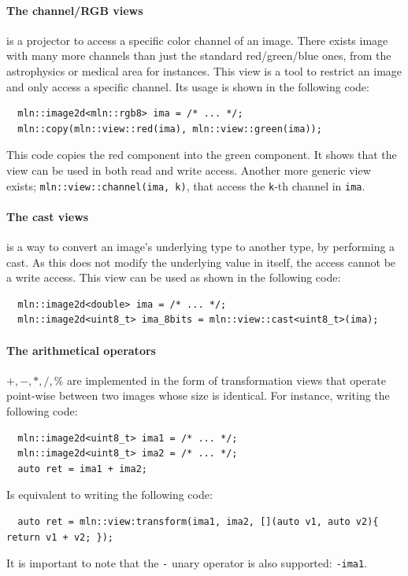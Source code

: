 \paragraph{The channel/RGB views} is a projector to access a specific color channel of an image. There exists image with
many more channels than just the standard red/green/blue ones, from the astrophysics or medical area for instances. This
view is a tool to restrict an image and only access a specific channel. Its usage is shown in the following code:
\begin{verbatim}
  mln::image2d<mln::rgb8> ima = /* ... */;
  mln::copy(mln::view::red(ima), mln::view::green(ima));
\end{verbatim}
This code copies the red component into the green component. It shows that the view can be used in both read and write
access. Another more generic view exists; \texttt{mln::view::channel(ima, k)}, that access the \texttt{k}-th
channel in \texttt{ima}.

\paragraph{The cast views} is a way to convert an image's underlying type to another type, by performing a cast. As this
does not modify the underlying value in itself, the access cannot be a write access. This view can be used as shown in
the following code:
\begin{verbatim}
  mln::image2d<double> ima = /* ... */;
  mln::image2d<uint8_t> ima_8bits = mln::view::cast<uint8_t>(ima);
\end{verbatim}

\paragraph{The arithmetical operators} $+, -, *, /, \%$ are implemented in the form of transformation views that operate
point-wise between two images whose size is identical. For instance, writing the following code:
\begin{verbatim}
  mln::image2d<uint8_t> ima1 = /* ... */;
  mln::image2d<uint8_t> ima2 = /* ... */;
  auto ret = ima1 + ima2;
\end{verbatim}
Is equivalent to writing the following code:
\begin{verbatim}
  auto ret = mln::view:transform(ima1, ima2, [](auto v1, auto v2){ return v1 + v2; });
\end{verbatim}
It is important to note that the \texttt{-} unary operator is also supported: \texttt{-ima1}.

